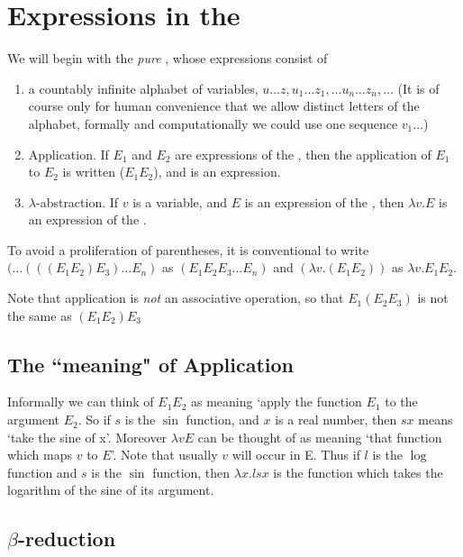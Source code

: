 \section{Expressions in the \LC}

We will begin with the {\em pure} \LC, whose expressions
consist of

\begin{enumerate}
\item a countably infinite alphabet of variables,
$u\ldots z, u_1 \ldots z_1, \ldots u_n \ldots z_n, \ldots $
(It is of course only for human convenience that we allow distinct letters
of the alphabet, formally and computationally we could use one sequence
$v_1\ldots$)

\item  Application.  If $E_1$ and $E_2$ are expressions of the \LC, then
the application of $E_1$ to $E_2$ is written ($E_1E_2$), and is an
expression.

\item  $\lambda$-abstraction.
If $v$ is a variable, and $E$ is an expression
of the \LC, then $\lambda v. E$ is an expression of the \LC.

\end{enumerate}
To avoid a proliferation of parentheses, it is conventional to write
$(\ldots(((E_1 E_2) E_3)\ldots E_n)$ as $(E_1 E_2 E_3\ldots E_n)$ and
$(\lambda v.(E_1E_2))$ as $\lambda v.E_1 E_2$.

Note that application is {\em not} an associative operation, so that  $E_1
(E_2 E_3)$ is not the same as $(E_1 E_2) E_3$

\subsection{The ``meaning" of Application}

Informally we can think of $E_1 E_2$ as meaning `apply the function $E_1$
to the argument $E_2$. So if $s$ is the $\sin$ function, and $x$ is a real
number, then $sx$ means `take the sine of x'.  Moreover $\lambda v E$ can
be thought of as meaning `that function which maps $v$ to $E$'. Note that
usually $v$ will occur in E. Thus if $l$ is the $\log$ function and
$s$ is the $\sin$ function, then $\lambda x. lsx$ is the function which
takes the logarithm of the sine of its argument.

\subsection{$\beta$-reduction}

